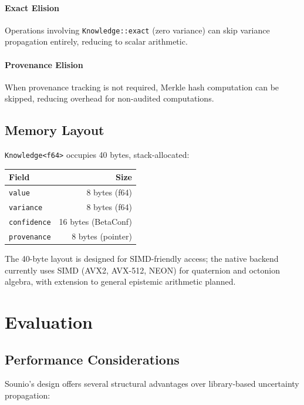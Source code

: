 \documentclass[11pt,a4paper]{article}
\begin{document}
\paragraph{Exact Elision}
Operations involving \texttt{Knowledge::exact} (zero variance) can skip variance
propagation entirely, reducing to scalar arithmetic.

\paragraph{Provenance Elision}
When provenance tracking is not required, Merkle hash computation can be skipped,
reducing overhead for non-audited computations.

\subsection{Memory Layout}

\texttt{Knowledge<f64>} occupies 40 bytes, stack-allocated:
\begin{center}
\begin{tabular}{lr}
\toprule
Field & Size \\
\midrule
\texttt{value} & 8 bytes (f64) \\
\texttt{variance} & 8 bytes (f64) \\
\texttt{confidence} & 16 bytes (BetaConf) \\
\texttt{provenance} & 8 bytes (pointer) \\
\bottomrule
\end{tabular}
\end{center}

The 40-byte layout is designed for SIMD-friendly access; the native backend
currently uses SIMD (AVX2, AVX-512, NEON) for quaternion and octonion algebra,
with extension to general epistemic arithmetic planned.

\section{Evaluation}
\label{sec:evaluation}

\subsection{Performance Considerations}

Sounio's design offers several structural advantages over library-based
uncertainty propagation:
\end{document}
